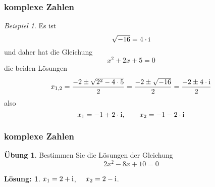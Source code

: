 \documentclass[hyperref={pdfpagelabels=false}]{beamer}
\theoremstyle{plain}%
\theoremstyle{definition}
\newtheorem*{uebung}{Übung}
\newtheorem*{sol}{Lösung:}
\theoremstyle{remark}
\newtheorem*{beispiel}{Beispiel}
\def \ii{{\relax\ifmmode \mathrm{i} \else i \fi}}
\begin{document}
\begin{frame}
\frametitle{komplexe Zahlen}

\begin{beispiel}
Es ist 
	$$ \sqrt{-16} = 4 \cdot \ii $$ \pause 
und daher hat die Gleichung 
	$$ x^2 + 2x + 5 = 0 $$
die beiden Lösungen 
	$$ x_{1,2} = \frac {-2 \pm \sqrt{2^2 - 4 \cdot 5}}{2} = \frac {-2 \pm \sqrt{-16}}{2} = \frac {-2 \pm 4 \cdot \ii}{2} $$
\pause 
also 
	$$ x_1 = -1 + 2 \cdot \ii , \qquad x_2 = -1 -2 \cdot \ii $$
\end{beispiel}

\end{frame}

\begin{frame}
\frametitle{komplexe Zahlen}
\begin{uebung}
Bestimmen Sie die Lösungen der Gleichung 
	$$ 2 x^2 - 8 x + 10 = 0 $$
\end{uebung}

\pause \pause 

\bigbreak

\begin{sol} 
$x_1 = 2+\ii$, $\quad x_2 = 2 - \ii$.
\end{sol}

\end{frame}
\end{document}
